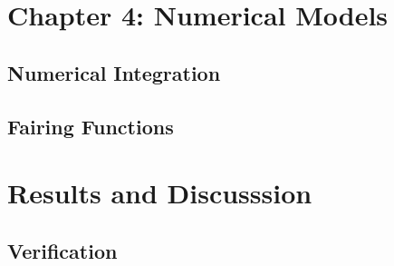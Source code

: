 \documentclass[12pt]{uthesis-v12}  %
\begin{document}
\chapter{Chapter 4: Numerical Models}
\section{Numerical Integration}



 

\section{Fairing Functions}






\chapter{Results and Discusssion}
\section{Verification}



\end{document}
